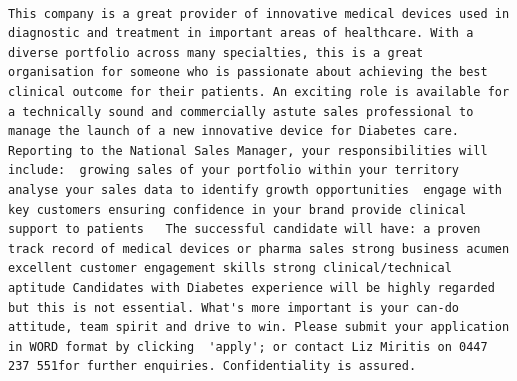 \documentclass[11pt,a4paper,]{article}
\begin{document}
\begin{verbatim}
                                                                                                                                                  This company is a great provider of innovative medical devices used in diagnostic and treatment in important areas of healthcare. With a diverse portfolio across many specialties, this is a great organisation for someone who is passionate about achieving the best clinical outcome for their patients. An exciting role is available for a technically sound and commercially astute sales professional to manage the launch of a new innovative device for Diabetes care. Reporting to the National Sales Manager, your responsibilities will include:  growing sales of your portfolio within your territory analyse your sales data to identify growth opportunities  engage with key customers ensuring confidence in your brand provide clinical support to patients   The successful candidate will have: a proven track record of medical devices or pharma sales strong business acumen excellent customer engagement skills strong clinical/technical aptitude Candidates with Diabetes experience will be highly regarded but this is not essential. What's more important is your can-do attitude, team spirit and drive to win. Please submit your application in WORD format by clicking  'apply'; or contact Liz Miritis on 0447 237 551for further enquiries. Confidentiality is assured.

\end{verbatim}
\end{document}
